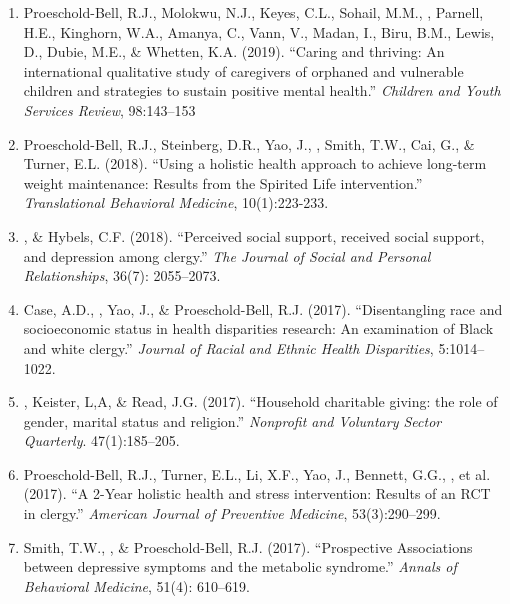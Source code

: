 \begin{enumerate}
\item Proeschold-Bell, R.J., Molokwu, N.J., Keyes, C.L., Sohail, M.M., \Eagle, Parnell, H.E., Kinghorn, W.A., Amanya, C., Vann, V., Madan, I., Biru, B.M., Lewis, D., Dubie, M.E., \& Whetten, K.A. (2019). ``Caring and thriving: An international qualitative study of caregivers of orphaned and vulnerable children and strategies to sustain positive mental health.''  \emph{Children and Youth Services Review}, 98:143--153  

\item Proeschold-Bell, R.J., Steinberg, D.R., Yao, J., \Eagle, Smith, T.W., Cai, G., \& Turner, E.L. (2018). ``Using a holistic health approach to achieve long-term weight maintenance: Results from the Spirited Life intervention.'' \emph{Translational Behavioral Medicine}, 10(1):223-233. 

\item \Eagle, \& Hybels, C.F. (2018). ``Perceived social support, received social support, and depression among clergy.'' \emph{The Journal of Social and Personal Relationships}, 36(7): 2055--2073. 

\item Case, A.D., \Eagle, Yao, J., \& Proeschold-Bell, R.J. (2017). ``Disentangling race and socioeconomic status in health disparities research: An examination of Black and white clergy.'' \emph{Journal of Racial and Ethnic Health Disparities}, 5:1014--1022. 

\item \Eagle, Keister, L,A, \& Read, J.G. (2017). ``Household charitable giving: the role of gender, marital status and religion.'' \emph{Nonprofit and Voluntary Sector Quarterly}. 47(1):185--205. 

\item Proeschold-Bell, R.J., Turner, E.L., Li, X.F., Yao, J., Bennett, G.G., \Eagle, et al. (2017). ``A 2-Year holistic health and stress intervention: Results of an RCT in clergy.'' \emph{American Journal of Preventive Medicine}, 53(3):290--299. 

\item Smith, T.W., \Eagle\CF, \& Proeschold-Bell, R.J. (2017). ``Prospective Associations between depressive symptoms and the metabolic syndrome.'' \emph{Annals of Behavioral Medicine}, 51(4): 610--619. 


\end{enumerate}
